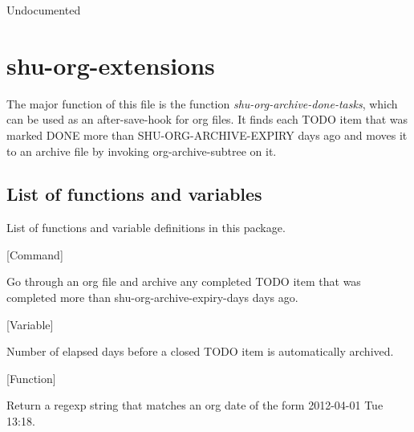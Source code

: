 \begin{doc-string}
Undocumented
\end{doc-string}

\eject
\section{shu-org-extensions}


The major function of this file is the function \emph{shu-org-archive-done-tasks},
which can be used as an after-save-hook for org files.  It finds each
TODO item that was marked DONE more than SHU-ORG-ARCHIVE-EXPIRY days
ago and moves it to an archive file by invoking org-archive-subtree
on it.


\subsection{List of functions and variables}

List of functions and variable definitions in this package.



\vspace{1em}
\noindent
{}
\usebox{\funcname}
 \hfill [Command]

\begin{doc-string}
Go through an org file and archive any completed TODO item that was completed more
than shu-org-archive-expiry-days days ago.
\end{doc-string}

\vspace{1em}
\noindent
{}
\usebox{\funcname}
 \hfill [Variable]

\begin{doc-string}
Number of elapsed days before a closed TODO item is automatically archived.
\end{doc-string}

\vspace{1em}
\noindent
{}
\usebox{\funcname}
 \hfill [Function]

\begin{doc-string}
Return a regexp string that matches an org date of the form 2012-04-01 Tue 13:18.
\end{doc-string}

